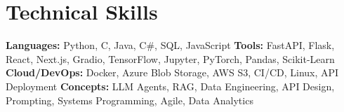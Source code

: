 

\section{Technical Skills}
\begin{itemize}[leftmargin=0.15in, label={}]
\small{\item{
\textbf{Languages:} Python, C, Java, C\#, SQL, JavaScript \quad
\textbf{Tools:} FastAPI, Flask, React, Next.js, Gradio, TensorFlow, Jupyter, PyTorch, Pandas, Scikit-Learn \quad
\textbf{Cloud/DevOps:} Docker, Azure Blob Storage, AWS S3, CI/CD, Linux, API Deployment\quad
\textbf{Concepts:} LLM Agents, RAG, Data Engineering, API Design, Prompting, Systems Programming, Agile, Data Analytics
}}
\end{itemize}
